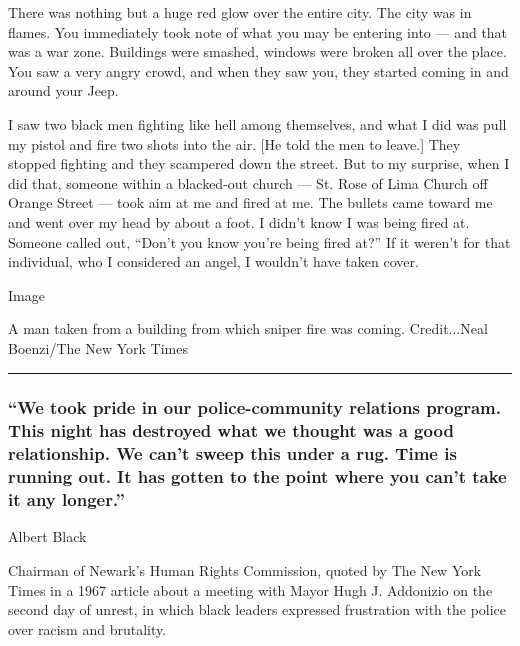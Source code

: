 There was nothing but a huge red glow over the entire city. The city was
in flames. You immediately took note of what you may be entering into
--- and that was a war zone. Buildings were smashed, windows were broken
all over the place. You saw a very angry crowd, and when they saw you,
they started coming in and around your Jeep.

I saw two black men fighting like hell among themselves, and what I did
was pull my pistol and fire two shots into the air. {[}He told the men
to leave.{]} They stopped fighting and they scampered down the street.
But to my surprise, when I did that, someone within a blacked-out church
--- St. Rose of Lima Church off Orange Street --- took aim at me and
fired at me. The bullets came toward me and went over my head by about a
foot. I didn't know I was being fired at. Someone called out, ``Don't
you know you're being fired at?'' If it weren't for that individual, who
I considered an angel, I wouldn't have taken cover.~

Image

A man taken from a building from which sniper fire was coming.
Credit...Neal Boenzi/The New York Times

\begin{center}\rule{0.5\linewidth}{\linethickness}\end{center}

\hypertarget{we-took-pride-in-our-police-community-relations-program-this-night-has-destroyed-what-we-thought-was-a-good-relationship-we-cant-sweep-this-under-a-rug-time-is-running-out-it-has-gotten-to-the-point-where-you-cant-take-it-any-longer}{%
\subsubsection{``We took pride in our police-community relations
program. This night has destroyed what we thought was a good
relationship. We can't sweep this under a rug. Time is running out. It
has gotten to the point where you can't take it any
longer.''}\label{we-took-pride-in-our-police-community-relations-program-this-night-has-destroyed-what-we-thought-was-a-good-relationship-we-cant-sweep-this-under-a-rug-time-is-running-out-it-has-gotten-to-the-point-where-you-cant-take-it-any-longer}}

Albert Black

Chairman of Newark's Human Rights Commission, quoted by The New York
Times in a 1967 article about a meeting with Mayor Hugh J. Addonizio on
the second day of unrest, in which black leaders expressed frustration
with the police over racism and brutality.

